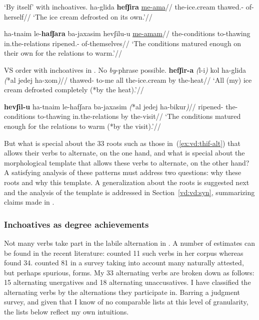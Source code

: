 \pex `By itself' with {\thif} inchoatives.
	\a \begingl
		\gla ha-glida \textbf{hefʃira} \underline{me-a{\ts}ma}//
		\glb the-ice.cream thawed.- of-herself//
		\glft `The ice cream defrosted on its own.'//
	\endgl
	
	\a \begingl
		\gla ha-tnaim le-\textbf{hafʃara} ba-jaxasim hevʃilu-u \underline{me-a{\ts}mam}//
		\glb the-conditions to-thawing in.the-relations ripened.- of-themselves//
		\glft `The conditions matured enough on their own for the relations to warm.'//
	\endgl
\xe

\pex\label{ex:vd:vs} VS order with {\thif} inchoatives in \thif. No \emph{by}-phrase possible.
	\a \begingl
		\gla \textbf{hefʃir-a} \emph{(}l-i\emph{)} kol ha-glida \emph{(}*{al jedej} ha-xom\emph{)}//
		\glb thawed- to-me all the-ice.cream \phantom{*(}by the-heat//
		\glft `All (my) ice cream defrosted completely (*by the heat).'//
	\endgl
	
	\a \begingl
		\gla \textbf{hevʃil-u} ha-tnaim le-hafʃara ba-jaxasim \emph{(}*{al jedej} ha-bikur\emph{)}//
		\glb ripened- the-conditions to-thawing in.the-relations \phantom{*(}by the-visit//
		\glft `The conditions matured enough for the relations to warm (*by the visit).'//
	\endgl
\xe

But what is special about the 33 roots such as those in~(\ref{ex:vd:thif-alt}) that allows their verbs to alternate, on the one hand, and what is special about the morphological template that allows these verbs to alternate, on the other hand? A satisfying analysis of these patterns must address two questions: why these roots and why this template. A generalization about the roots is suggested next and the analysis of the template is addressed in Section~\ref{vd:vd:syn}, summarizing claims made in \cite{kastner19tlr}.

		\subsubsection{Inchoatives as degree achievements} \label{vd:thif:inch:roots}
Not many verbs take part in the labile alternation in {\thit}. A number of estimates can be found in the recent literature: \cite{arad05} counted 11 such verbs in her corpus whereas \cite{laks11} found 34. \cite{lev16} counted 81 in a survey taking into account many naturally attested, but perhaps spurious, forms. My 33 alternating verbs are broken down as follows: 15 alternating unergatives and 18 alternating unaccusatives. I have classified the alternating verbs by the alternations they participate in. Barring a judgment survey, and given that I know of no comparable lists at this level of granularity, the lists below reflect my own intuitions.

